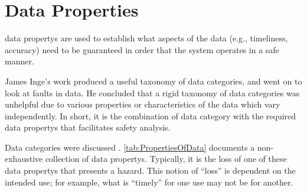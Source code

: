 %
%
\chapter{Data Properties}\label{bkm:dataProperties}


\Glspl{data property} are used to establish what aspects of the data (e.g., \gls{timeliness}, \gls{accuracy}) need to be guaranteed in order that the system operates in a safe manner.

James Inge's work \cite{citation:inge2008improving} produced a useful taxonomy of data categories, and went on to look at faults in data. He concluded that a rigid taxonomy of data categories was unhelpful due to various properties or characteristics of the data which vary independently. In short, it is the combination of data category with the required \glspl{data property} that facilitates safety analysis.

Data categories were discussed . \autoref{tab:PropertiesOfData} documents a non-exhaustive collection of \glspl{data property}. Typically, it is the loss of one of these \glspl{data property} that presents a \gls{hazard}. This notion of ``loss'' is dependent on the intended use; for example, what is ``timely'' for one use may not be for another.

